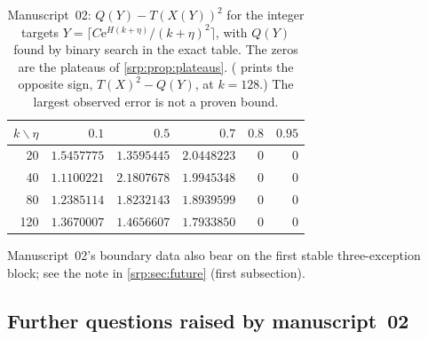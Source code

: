 \documentclass[11pt,a4paper]{article}
\numberwithin{equation}{section}
\theoremstyle{definition}
\theoremstyle{remark}
\newcommand{\e}{\mathrm e}
\begin{document}
\begin{table}[htbp]
\centering\small
\begin{tabular}{r rrrrr}
\toprule
$k\backslash\eta$ & $0.1$ & $0.5$ & $0.7$ & $0.8$ & $0.95$\\
\midrule
20 & $1.5457775$ & $1.3595445$ & $2.0448223$ & $0$ & $0$\\
40 & $1.1100221$ & $2.1807678$ & $1.9945348$ & $0$ & $0$\\
80 & $1.2385114$ & $1.8232143$ & $1.8939599$ & $0$ & $0$\\
120 & $1.3670007$ & $1.4656607$ & $1.7933850$ & $0$ & $0$\\
\bottomrule
\end{tabular}
\caption{Manuscript~02: $Q(Y)-T(X(Y))^2$ for the integer targets
$Y=\lceil C\e^{H(k+\eta)}/(k+\eta)^2\rceil$, with $Q(Y)$ found by binary
search in the exact table. The zeros are the plateaus of
\cref{srp:prop:plateaus}. ( prints the
opposite sign, $T(X)^2-Q(Y)$, at $k=128$.) The largest observed error is
not a proven bound.}
\label{srp:se:tab:inverse}
\end{table}

Manuscript~02's boundary data also bear on the first stable
three-exception block; see the note in
\cref{srp:sec:future} (first subsection).

\subsection{Further questions raised by manuscript~02}
\label{srp:se:sec:questions}
\end{document}
